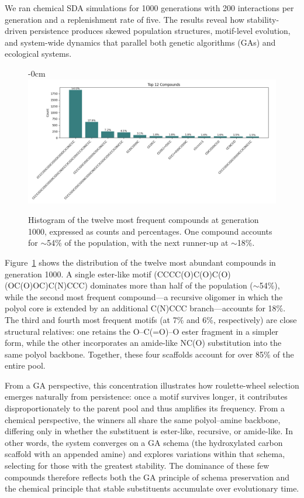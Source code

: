 \documentclass[life,article,submit,pdftex,moreauthors]{Definitions/mdpi}
\begin{document}
We ran chemical SDA simulations for 1000 generations with 200 interactions per generation and a replenishment rate of five. The results reveal how stability-driven persistence produces skewed population structures, motif-level evolution, and system-wide dynamics that parallel both genetic algorithms (GAs) and ecological systems.  

\begin{figure}[H]
\begin{adjustwidth}{-\extralength}{0cm}
\centering
\includegraphics[width=\fulllength]{SDA-chem-hist.png}
\end{adjustwidth}
\caption{Histogram of the twelve most frequent compounds at generation 1000, expressed as counts and percentages. One compound accounts for $\sim$54\% of the population, with the next runner-up at $\sim$18\%.}
\label{fig:chem-compound-hist}
\end{figure}

Figure~\ref{fig:chem-compound-hist} shows the distribution of the twelve most abundant compounds in generation 1000. A single ester-like motif (CCCC(O)C(O)C(O)(OC(O)OC)C(N)CCC) dominates more than half of the population ($\sim$54\%), while the second most frequent compound---a recursive oligomer in which the polyol core is extended by an additional C(N)CCC branch---accounts for 18\%. The third and fourth most frequent motifs (at 7\% and 6\%, respectively) are close structural relatives: one retains the O–C(=O)–O ester fragment in a simpler form, while the other incorporates an amide-like NC(O) substitution into the same polyol backbone. Together, these four scaffolds account for over 85\% of the entire pool.

From a GA perspective, this concentration illustrates how roulette-wheel selection emerges naturally from persistence: once a motif survives longer, it contributes disproportionately to the parent pool and thus amplifies its frequency. From a chemical perspective, the winners all share the same polyol–amine backbone, differing only in whether the substituent is ester-like, recursive, or amide-like. In other words, the system converges on a GA schema (the hydroxylated carbon scaffold with an appended amine) and explores variations within that schema, selecting for those with the greatest stability. The dominance of these few compounds therefore reflects both the GA principle of schema preservation and the chemical principle that stable substituents accumulate over evolutionary time.
\end{document}
